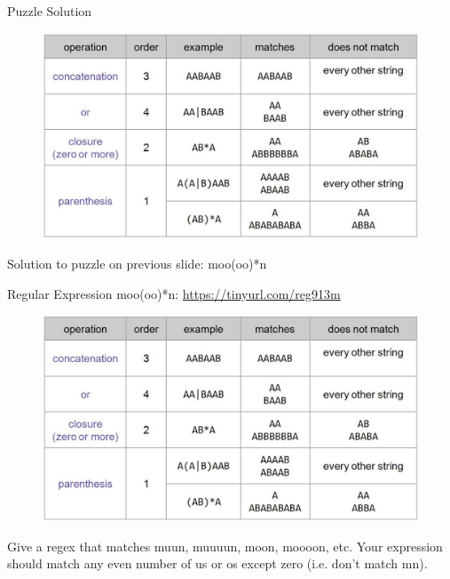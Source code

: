 \documentclass[aspectratio=169]{../latex_main/tntbeamer}  %
\begin{document}
	
	\begin{frame}{Puzzle Solution}
 

        \begin{figure}
	        \centering
	        \includegraphics[scale=.35]{Bild10}
	    \end{figure}
	    Solution to puzzle on previous slide: moo(oo)*n

	\end{frame}
	
	
	
	\begin{frame}{Regular Expression moo(oo)*n: \url{https://tinyurl.com/reg913m}}
 

        \begin{figure}
	        \centering
	        \includegraphics[scale=.35]{Bild10}
	    \end{figure}
	    Give a regex that matches muun, muuuun, moon, moooon, etc. Your expression should match any even number of us or os except zero (i.e. don’t match mn).


	\end{frame}
	
	
	
\end{document}
